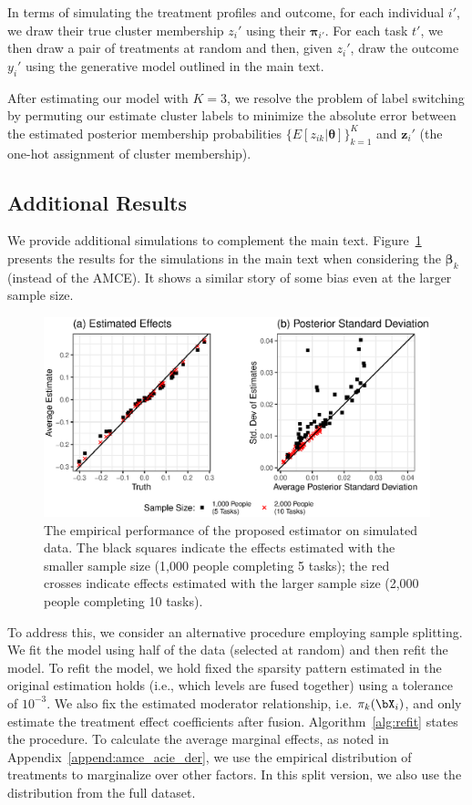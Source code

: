 In terms of simulating the treatment profiles and outcome, for each individual $i'$, we draw their true cluster membership $z_i'$ using their $\bm{\pi}_{i'}$. For each task $t'$, we then draw a pair of treatments at random and then, given $z_i'$, draw the outcome $y_i'$ using the generative model outlined in the main text. 

After estimating our model with $K = 3$, we resolve the problem of label switching by permuting our estimate cluster labels to minimize the absolute error between the estimated posterior membership probabilities $\{E[z_{ik} | \bm{\theta}]\}_{k=1}^K$ and $\bm{z}_i'$ (the one-hot assignment of cluster membership).

\subsection{Additional Results}
\label{sec:app_simulations_coverage}

We provide additional simulations to complement the main text. Figure~\ref{fig:app_simulation_beta} presents the results for the simulations in the main text when considering the $\bm{\beta}_k$ (instead of the AMCE). It shows a similar story of some bias even at the larger sample size.

\begin{figure}[!ht]
	\centering {}
	\includegraphics[width=\textwidth]{figures/sim_ame.eps}
	\caption{The empirical performance of the proposed estimator on
		simulated data. The black squares indicate the effects estimated
		with the smaller sample size (1,000 people completing 5 tasks);
		the red crosses indicate effects estimated with the larger sample
		size (2,000 people completing 10 tasks).}
	\label{fig:app_simulation_beta}
\end{figure}

To address this, we consider an alternative procedure employing sample splitting. We fit the model using half of the data (selected at random) and then refit the model. To refit the model, we hold fixed the sparsity pattern estimated in the original estimation holds (i.e., which levels are fused together) using a tolerance of $10^{-3}$. We also fix the estimated moderator relationship, i.e. $\pi_{k}(\bX_i)$, and only estimate the treatment effect coefficients after fusion. Algorithm~\ref{alg:refit} states the procedure. To calculate the average marginal effects, as noted in Appendix~\ref{append:amce_acie_der}, we use the empirical distribution of treatments to marginalize over other factors. In this split version, we also use the distribution from the full dataset.

